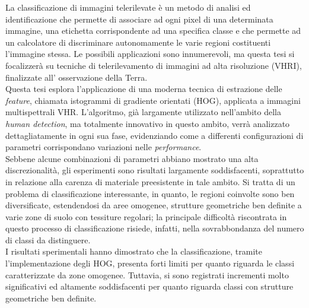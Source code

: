 
\italiano
\sommario
La classificazione di immagini telerilevate è un metodo di analisi ed identificazione che permette di associare ad ogni pixel di una determinata immagine, una etichetta corrispondente ad una specifica classe e che permette ad un calcolatore di discriminare autonomamente le varie regioni costituenti l'immagine stessa. 
Le possibili applicazioni sono innumerevoli, ma questa tesi si focalizzerà su tecniche di telerilevamento di immagini ad alta risoluzione (VHRI), finalizzate all' osservazione della Terra. 
\\

Questa tesi esplora l'applicazione di una moderna tecnica di estrazione delle \emph{feature}, chiamata istogrammi di gradiente orientati (HOG), applicata a immagini multispettrali VHR.   
L'algoritmo, già largamente utilizzato nell'ambito della \emph{human detection}, ma totalmente innovativo in questo ambito, verrà analizzato dettagliatamente in ogni sua fase, evidenziando come a differenti configurazioni di parametri corrispondano variazioni nelle \emph{performance}. 
\\

Sebbene alcune combinazioni di parametri abbiano mostrato una alta discrezionalità, gli esperimenti sono risultati largamente soddisfacenti, soprattutto in relazione alla carenza di materiale preesistente in tale ambito.
Si tratta di un problema di classificazione interessante, in quanto, le regioni coinvolte sono ben diversificate, estendendosi da aree omogenee, strutture geometriche ben definite a varie zone di suolo con tessiture regolari; la principale difficoltà riscontrata in questo processo di classificazione risiede, infatti, nella sovrabbondanza del numero di classi da distinguere.
\\

I risultati sperimentali hanno dimostrato che la classificazione, tramite l'implementazione degli HOG, presenta forti limiti per quanto riguarda le classi caratterizzate da zone omogenee. Tuttavia, si sono registrati incrementi molto significativi ed altamente soddisfacenti per quanto riguarda classi con strutture geometriche ben definite.  


